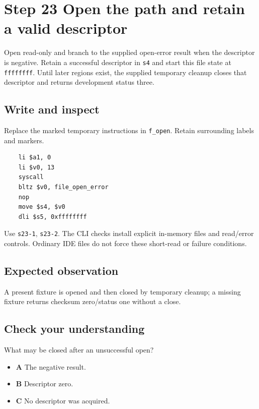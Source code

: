 \section{Step 23 Open the path and retain a valid descriptor}\label{crc-s23}

Open read-only and branch to the supplied open-error result when the descriptor is negative. Retain a successful descriptor in \texttt{s4} and start this file state at \texttt{ffffffff}. Until later regions exist, the supplied temporary cleanup closes that descriptor and returns development status three.

\subsection{Write and inspect}
Replace the marked temporary instructions in \texttt{f\_open}. Retain surrounding labels and markers.

\begin{verbatim}
    li $a1, 0
    li $v0, 13
    syscall
    bltz $v0, file_open_error
    nop
    move $s4, $v0
    dli $s5, 0xffffffff
\end{verbatim}

Use \texttt{s23-1}, \texttt{s23-2}. The CLI checks install explicit in-memory files and read/error controls. Ordinary IDE files do not force these short-read or failure conditions.

\subsection{Expected observation}
A present fixture is opened and then closed by temporary cleanup; a missing fixture returns checksum zero/status one without a close.

\subsection{Check your understanding}
What may be closed after an unsuccessful open?

\begin{itemize}
  \item \textbf{A} The negative result.
  \item \textbf{B} Descriptor zero.
  \item \textbf{C} No descriptor was acquired.
\end{itemize}
